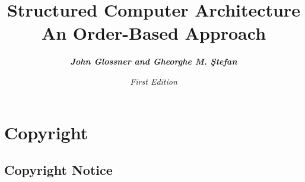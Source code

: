 \documentclass[11pt]{book}
\begin{document}
\pagestyle{fancy}
\sloppy

\fancyhead{} %
\fancyhead[LE]{\footnotesize } %
\fancyhead[RO]{\footnotesize } %
\fancyhead[LO]{\scriptsize \rightmark} %
\fancyhead[RE]{\scriptsize \leftmark} %
\fancyfoot{} %
\fancyfoot[RO]{\footnotesize \thepage} %
\fancyfoot[LE]{\footnotesize \thepage} %


\title{{\Huge {\bf Structured Computer Architecture\\
An Order-Based Approach}}
}
\author{{\LARGE {\bf \em John Glossner and Gheorghe M. \c{S}tefan}}}
\date{
{\em First Edition}
}



\maketitle


\chapter*{Copyright}

\section*{Copyright Notice}

\vspace{\baselineskip}\par
\end{document}

